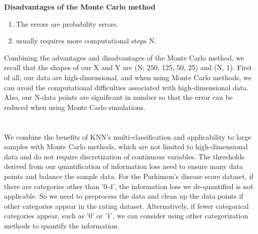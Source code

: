 \textbf{Disadvantages of the Monte Carlo method}
\begin{enumerate}
    \item The errors are probability errors.
    \item usually requires more computational steps N.
\end{enumerate}
Combining the advantages and disadvantages of the Monte Carlo method, we recall that the shapes of our X and Y are (N; 250, 125, 50, 25) and (N, 1). First of all, our data are high-dimensional, and when using Monte Carlo methods, we can avoid the computational difficulties associated with high-dimensional data. Also, our N-data points are significant in number so that the error can be reduced when using Monte Carlo simulations.\\
\\ \hspace*{\fill} \\
We combine the benefits of KNN's multi-classification and applicability to large samples with Monte Carlo methods, which are not limited to high-dimensional data and do not require discretization of continuous variables. The thresholds derived from our quantification of information loss need to ensure many data points and balance the sample data. For the Parkinson's disease score dataset, if there are categories other than '0-4', the information loss we de-quantified is not applicable. So we need to preprocess the data and clean up the data points if other categories appear in the rating dataset. Alternatively, if fewer categorical categories appear, such as '0' or '1', we can consider using other categorization methods to quantify the information.








